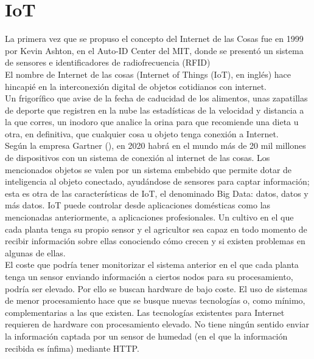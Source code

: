 \documentclass[12pt, twoside]{book}
\newcommand{\MYhref}[3][blue]{\href{#2}{\color{#1}{#3}}}
\begin{document}
\chapter{IoT}
La primera vez que se propuso el concepto del Internet de las Cosas fue en 1999 por Kevin Ashton, en el Auto-ID Center del MIT, donde se presentó un sistema de sensores e identificadores de radiofrecuencia (RFID)\\
El nombre de Internet de las cosas (Internet of Things (IoT), en inglés)\cite{iot}\cite{iot_book} hace hincapié en la interconexión digital de objetos cotidianos con internet.\\
Un frigorífico que avise de la fecha de caducidad de los alimentos, unas zapatillas de deporte que registren en la nube las estadísticas de la velocidad y distancia a la que corres, un inodoro que analice la orina para que recomiende una dieta u otra, en definitiva, que cualquier cosa u objeto tenga conexión a Internet. \\
Según la empresa Gartner (\MYhref{http://www.gartner.com/newsroom/id/3598917}{link}), en 2020 habrá en el mundo más de 20 mil millones de dispositivos con un sistema de conexión al internet de las cosas. Los mencionados objetos se valen por un sistema embebido que permite dotar de inteligencia al objeto conectado, ayudándose de sensores para captar información; esta es otra de las características de IoT, el denominado Big Data: datos, datos y más datos.
IoT puede controlar desde aplicaciones domésticas como las mencionadas anteriormente, a aplicaciones profesionales. Un cultivo en el que cada planta tenga su propio sensor y el agricultor sea capaz en todo momento de recibir información sobre ellas conociendo cómo crecen y si existen problemas en algunas de ellas. \\
El coste que podría tener monitorizar el sistema anterior en el que cada planta tenga un sensor enviando información a ciertos nodos para su procesamiento, podría ser elevado. Por ello se buscan hardware de bajo coste. El uso de sistemas de menor procesamiento hace que se busque nuevas tecnologías o, como mínimo, complementarias a las que existen. Las tecnologías existentes para Internet requieren de hardware con procesamiento elevado. No tiene ningún sentido enviar la información captada por un sensor de humedad (en el que la información recibida es ínfima) mediante HTTP.\\
\end{document}
